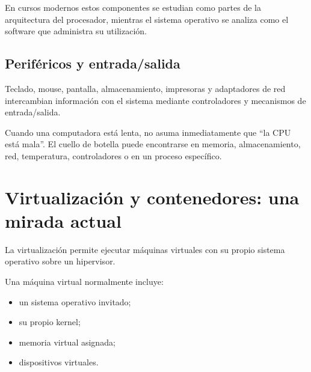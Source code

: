 \documentclass[
  spanish,
  letterpaper,
]{scrbook}
\providecommand{\tightlist}{%
  \setlength{\itemsep}{0pt}\setlength{\parskip}{0pt}}
\begin{document}
En cursos modernos estos componentes se estudian como partes de la
arquitectura del procesador, mientras el sistema operativo se analiza
como el software que administra su utilización.

\section{Periféricos y
entrada/salida}\label{perifuxe9ricos-y-entradasalida}

Teclado, mouse, pantalla, almacenamiento, impresoras y adaptadores de
red intercambian información con el sistema mediante controladores y
mecanismos de entrada/salida.

\begin{tcolorbox}[enhanced jigsaw, arc=.35mm, bottomrule=.15mm, bottomtitle=1mm, breakable, colback=white, colbacktitle=quarto-callout-tip-color!10!white, colframe=quarto-callout-tip-color-frame, coltitle=black, left=2mm, leftrule=.75mm, opacityback=0, opacitybacktitle=0.6, rightrule=.15mm, title=\textcolor{quarto-callout-tip-color}{\faLightbulb}\hspace{0.5em}{Consejo del Ingeniero}, titlerule=0mm, toprule=.15mm, toptitle=1mm]

Cuando una computadora está lenta, no asuma inmediatamente que ``la CPU
está mala''. El cuello de botella puede encontrarse en memoria,
almacenamiento, red, temperatura, controladores o en un proceso
específico.

\end{tcolorbox}


\chapter{Virtualización y contenedores: una mirada
actual}\label{virtualizaciuxf3n-y-contenedores-una-mirada-actual}

La virtualización permite ejecutar máquinas virtuales con su propio
sistema operativo sobre un hipervisor.

Una máquina virtual normalmente incluye:

\begin{itemize}
\tightlist
\item
  un sistema operativo invitado;
\item
  su propio kernel;
\item
  memoria virtual asignada;
\item
  dispositivos virtuales.
\end{itemize}
\end{document}
